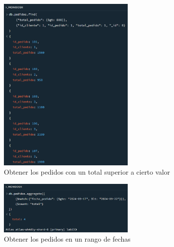 \begin{figure}[H]
    \centering
    \includegraphics[width=0.6\textwidth]{./p1_superior.png}
    \caption{Obtener los pedidos con un total superior a cierto valor}\label{fig:superior}
\end{figure}

\begin{figure}[H]
    \centering
    \includegraphics[width=0.6\textwidth]{./p1_rangofecha.png}
    \caption{Obtener los pedidos en un rango de fechas}\label{fig:rangofecha}
\end{figure}

